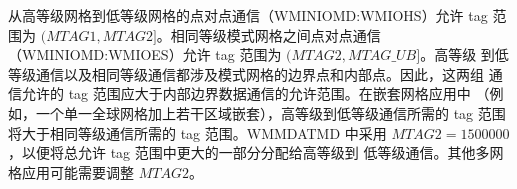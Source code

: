 从高等级网格到低等级网格的点对点通信（{\file WMINIOMD:WMIOHS}）允许
tag 范围为 $(MTAG1,MTAG2]$。相同等级模式网格之间点对点通信
（{\file WMINIOMD:WMIOES}）允许 tag 范围为 $(MTAG2,MTAG\_UB]$。高等级
到低等级通信以及相同等级通信都涉及模式网格的边界点和内部点。因此，这两组
通信允许的 tag 范围应大于内部边界数据通信的允许范围。在嵌套网格应用中
（例如，一个单一全球网格加上若干区域嵌套），高等级到低等级通信所需的
tag 范围将大于相同等级通信所需的 tag 范围。{\file WMMDATMD} 中采用
$MTAG2 = 1500000$，以便将总允许 tag 范围中更大的一部分分配给高等级到
低等级通信。其他多网格应用可能需要调整 $MTAG2$。


